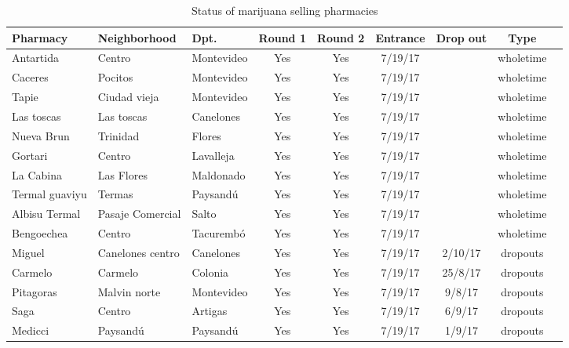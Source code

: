 \documentclass[11pt]{article}
\begin{document}
\begin{small}
\begin{table}[htbp!]
\scriptsize
    \centering
     \caption{Status of  marijuana selling pharmacies}
    \label{tab:pharmsalestatus}
    \begin{tabular}{@{}lllcccccc@{}}
\textbf{Pharmacy}	&	\textbf{Neighborhood}	&	\textbf{Dpt.}	&	\textbf{Round 1}	&	\textbf{Round 2}	&	\textbf{Entrance}	&	\textbf{Drop out}	&	\textbf{Type}	\\
\midrule
Antartida	 	&	 	Centro	 	&	 	Montevideo	 	&	 	Yes	 	&	 	Yes	 	&	 	7/19/17	 	&	 		 	&	 	wholetime	\\
 Caceres 	 	&	 	Pocitos	 	&	 	Montevideo	 	&	 	Yes	 	&	 	Yes	 	&	 	7/19/17	 	&	 		 	&	 	wholetime	\\
 Tapie	 	&	 	Ciudad vieja	 	&	 	Montevideo	 	&	 	Yes	 	&	 	Yes	 	&	 	7/19/17	 	&	 		 	&	 	wholetime	\\
 Las toscas	 	&	 	Las toscas	 	&	 	Canelones	 	&	 	Yes	 	&	 	Yes	 	&	 	7/19/17	 	&	 		 	&	 	wholetime	\\
 Nueva Brun	 	&	 	Trinidad	 	&	 	Flores	 	&	 	Yes	 	&	 	Yes	 	&	 	7/19/17	 	&	 		 	&	 	wholetime	\\
 Gortari	 	&	 	Centro	 	&	 	Lavalleja	 	&	 	Yes	 	&	 	Yes	 	&	 	7/19/17	 	&	 		 	&	 	wholetime	\\
 La Cabina	 	&	 	Las Flores	 	&	 	Maldonado	 	&	 	Yes	 	&	 	Yes	 	&	 	7/19/17	 	&	 		 	&	 	wholetime	\\
 Termal guaviyu	 	&	 	Termas	 	&	 	Paysandú	 	&	 	Yes	 	&	 	Yes	 	&	 	7/19/17	 	&	 		 	&	 	wholetime	\\
 Albisu Termal	 	&	 	Pasaje Comercial	 	&	 	Salto	 	&	 	Yes	 	&	 	Yes	 	&	 	7/19/17	 	&	 		 	&	 	wholetime	\\
 Bengoechea	 	&	 	Centro	 	&	 	Tacurembó	 	&	 	Yes	 	&	 	Yes	 	&	 	7/19/17	 	&	 		 	&	 	wholetime	\\
 Miguel	 	&	 	Canelones centro	 	&	 	Canelones	 	&	 	Yes	 	&	 	Yes	 	&	 	7/19/17	 	&	 	2/10/17	 	&	 	dropouts	\\
 Carmelo	 	&	 	Carmelo	 	&	 	Colonia	 	&	 	Yes	 	&	 	Yes	 	&	 	7/19/17	 	&	 	25/8/17	 	&	 	dropouts	\\
 Pitagoras	 	&	 	Malvin norte	 	&	 	Montevideo	 	&	 	Yes	 	&	 	Yes	 	&	 	7/19/17	 	&	 	9/8/17	 	&	 	dropouts	\\
 Saga	 	&	 	Centro	 	&	 	Artigas	 	&	 	Yes	 	&	 	Yes	 	&	 	7/19/17	 	&	 	6/9/17	 	&	 	dropouts	\\
 Medicci	 	&	 	Paysandú	 	&	 	Paysandú	 	&	 	Yes	 	&	 	Yes	 	&	 	7/19/17	 	&	 	1/9/17	 	&	 	dropouts	\\

\end{tabular}
\end{table}
\end{small}
\end{document}
